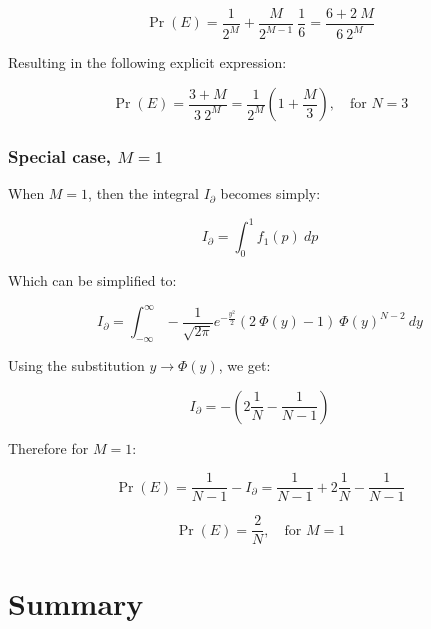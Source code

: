 \documentclass{article}
\theoremstyle{definition}
\begin{document}
\begin{equation}
    \Pr(E) 
    = 
    \frac{1}{2^M}
    +
    \frac{M}{2^{M-1}} \ \frac{1}{6}
    =
    \frac{6 + 2 \ M}{6 \ 2^M}
\end{equation}

Resulting in the following explicit expression:

\begin{equation}
\boxed{
    \Pr(E) 
    = 
    \frac{3 + M}{3 \ 2^M}
    =
    \frac{1}{2^M} 
    \left(
    1 + \frac{M}{3}
    \right),
    \quad \text{for } N=3
    }
\end{equation}

\subsubsection{Special case, $M=1$}

When $M=1$, then the integral $I_\partial$ becomes simply:

\begin{equation}
    I_\partial = \int_0^1 f_1(p) \ dp
\end{equation}

Which can be simplified to:

\begin{equation}
    I_\partial = 
    \int_{-\infty}^\infty 
    - \frac{1}{\sqrt{2 \pi}} e^{-\frac{y^2}{2}}
\left(
2 \ \Phi(y) - 1
\right)
    \  \Phi(y)^{N-2}
    \ d y
\end{equation}

Using the substitution $y \to \Phi(y)$, we get:

\begin{equation}
    I_\partial = 
    -
    \left(
    2 \frac{1}{N} - \frac{1}{N-1}
    \right)
\end{equation}

Therefore for $M=1$:

\begin{equation}
    \Pr(E) 
    = 
    \frac{1}{N-1}
    - I_\partial
    =
    \frac{1}{N-1} + 2 \frac{1}{N} - \frac{1}{N-1}
\end{equation}

\begin{equation}
\boxed{
    \Pr(E) 
    = 
    \frac{2}{N}, \quad \text{for } M=1
    }
\end{equation}

\section{Summary}
\end{document}
